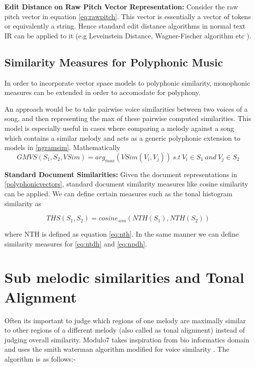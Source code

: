 \noindent \textbf{Edit Distance on Raw Pitch Vector Representation:} Consider the raw pitch vector in equation \ref{eq:rawpitch}. This vector is essentially a vector of tokens or equivalently a string. Hence standard edit distance algorithms in normal text IR can be applied to it (e.g Leveinstein Distance, Wagner-Fischer algorithm etc \cite{simtour}).

\subsection{Similarity Measures for Polyphonic Music} \label{polyphonicsim}

\noindent In order to incorporate vector space models to polyphonic similarity, monophonic measures can be extended in order to accomodate for polyphony.

 An approach would be to take pairwise voice similarities between two voices of a song, and then representing the max of these pairwise computed similarities. This model is especially useful in cases where comparing a melody against a song which contains a similar melody and acts as a generic polyphonic extension to models in \ref{ngramsim}. Mathematically 
\begin{equation}
GMVS(S_1, S_2, VSim) = arg_{max} (VSim(V_i, V_j)) \ s.t \ V_i \in S_1 \ and \ V_j \in S_2
\end{equation}

\noindent \textbf{Standard Document Similarities: } Given the document representations in \ref{polyphonicvectors}, standard document similarity measures like cosine similarity can be applied. We can define certain measures such as the tonal histogram similarity as 

\begin{equation}
THS(S_1, S_2) = cosine_{sim} (NTH(S_1), NTH(S_2))
\end{equation}

\noindent where NTH is defined as equation \ref{eq:nth}. In the same manner we can define similarity measures for \ref{eq:ntdh} and \ref{eq:npdh}.

\section{Sub melodic similarities and Tonal Alignment} \label{sim:unequal}

\noindent Often its important to judge which regions of one melody are maximally similar to other regions of a different melody (also called as tonal alignment) instead of judging overall similarity. Modulo7 takes inspiration from bio informatics domain and uses the smith waterman algorithm modified for voice similarity \cite{smithWatermanBook}. The algorithm is as follows:-

